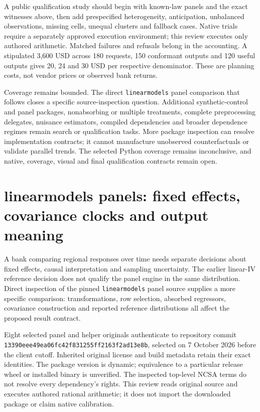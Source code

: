 A public qualification study should begin with known-law panels and the
exact witnesses above, then add prespecified heterogeneity, anticipation,
unbalanced observations, missing cells, unequal clusters and fallback cases.
Native trials require a separately approved execution environment; this
review executes only authored arithmetic. Matched failures and refusals
belong in the accounting. A stipulated 3,600 USD across 180 requests,
150 conformant outputs and 120 useful outputs gives 20, 24 and 30 USD
per respective denominator. These are planning costs, not vendor prices
or observed bank returns.
\citep{exec24_panelpy_contract}

Coverage remains bounded. The direct \texttt{linearmodels} panel comparison
that follows closes a specific source-inspection question. Additional
synthetic-control and panel packages, nonabsorbing or multiple treatments,
complete preprocessing delegates, nuisance estimators, compiled dependencies
and broader dependence regimes remain search or qualification tasks. More package inspection can resolve implementation
contracts; it cannot manufacture unobserved counterfactuals or validate
parallel trends. The selected Python coverage remains inconclusive, and
native, coverage, visual and final qualification contracts remain open.
\citep{exec24_panelpy_contract}


\section{linearmodels panels: fixed effects, covariance clocks and output meaning}
\label{sec:exec24-linearmodels-panel}

A bank comparing regional responses over time needs separate decisions about
fixed effects, causal interpretation and sampling uncertainty. The earlier
linear-IV reference decision does not qualify the panel engine in the same
distribution. Direct inspection of the pinned \texttt{linearmodels} panel
source supplies a more specific comparison: transformations, row selection,
absorbed regressors, covariance construction and reported reference
distributions all affect the proposed result contract.
\citep{exec22_linearmodels_reuse,exec24_lmpanel_source,exec24_lmpanel_reference}

Eight selected panel and helper originals authenticate to repository commit
\texttt{13390eee\allowbreak{}49ea06fc\allowbreak{}42f83125\allowbreak{}5ff2163f\allowbreak{}2ad13e8b}, selected on
7 October 2026 before the client cutoff. Inherited original license and
build metadata retain their exact identities. The package version is dynamic;
equivalence to a particular release wheel or installed binary is unverified.
The inspected top-level NCSA terms do not resolve every dependency's rights.
This review reads original source and executes authored rational arithmetic;
it does not import the downloaded package or claim native calibration.
\citep{exec22_linearmodels_reuse,exec24_lmpanel_source}

